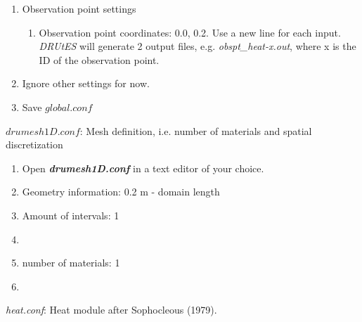 \begin{enumerate}
\begin{enumerate}
\end{enumerate}
\item Observation point settings \begin{enumerate}
\item Observation point coordinates: 0.0, 0.2. Use a new line for each input. \textit{DRUtES} will generate 2 output files, e.g. \textit{obspt\_heat-x.out}, where x is the ID of the observation point. 
\end{enumerate}
\item Ignore other settings for now. 
\item Save $global.conf$
\end{enumerate}


$drumesh1D.conf$: Mesh definition, i.e. number of materials and spatial discretization
\begin{enumerate}
\item Open \textbf{\emph{drumesh1D.conf}} in a text editor of your choice. 
\item Geometry information: 0.2 m - domain length
\item Amount of intervals: 1
\item
{}
\item number of materials: 1
\item {}
\end{enumerate}

\emph{heat.conf}: Heat module after Sophocleous (1979). 


